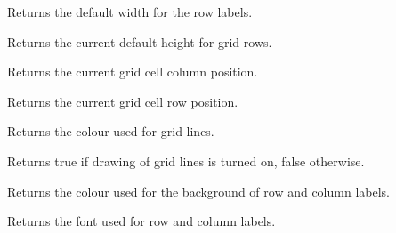 Returns the default width for the row labels.



\label{wxgridgetdefaultrowsize}


Returns the current default height for grid rows.



\label{wxgridgetgridcursorcol}


Returns the current grid cell column position.



\label{wxgridgetgridcursorrow}


Returns the current grid cell row position.



\label{wxgridgetgridlinecolour}


Returns the colour used for grid lines.



\label{wxgridgridlinesenabled}


Returns true if drawing of grid lines is turned on, false otherwise.



\label{wxgridgetlabelbackgroundcolour}


Returns the colour used for the background of row and column labels.



\label{wxgridgetlabelfont}


Returns the font used for row and column labels.



\label{wxgridgetlabeltextcolour}


